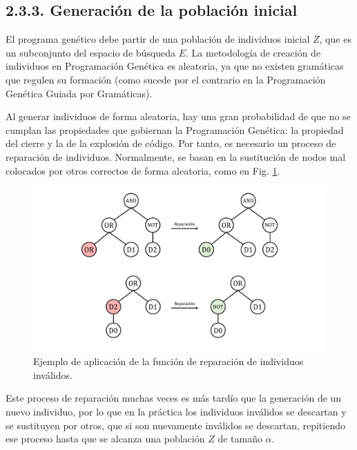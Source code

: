 \documentclass[spanish,a4paper,12pt,twoside]{report}
\begin{document}
    \subsection*{\large 2.3.3. Generación de la población inicial}
    El programa genético debe partir de una población de individuos inicial $Z$, que es un subconjunto del espacio de búsqueda $E$. La metodología de creación de individuos en Programación Genética es aleatoria, ya que no existen gramáticas que regulen su formación (como sucede por el contrario en la Programación Genética Guiada por Gramáticas). \par
    Al generar individuos de forma aleatoria, hay una gran probabilidad de que no se cumplan las propiedades que gobiernan la Programación Genética: la propiedad del cierre y la de la explosión de código. Por tanto, es necesario un proceso de reparación de individuos. Normalmente, se basan en la sustitución de nodos mal colocados por otros correctos de forma aleatoria, como en Fig. \ref{fig:5}. \par
    \begin{figure}[H]
      \centering
      \includegraphics[width = 1\textwidth]{resources/Fig5.pdf}
      \caption{Ejemplo de aplicación de la función de reparación de individuos inválidos.}
      \label{fig:5}
    \end{figure} \par
    Este proceso de reparación muchas veces es más tardío que la generación de un nuevo individuo, por lo que en la práctica los individuos inválidos se descartan y se sustituyen por otros, que si son nuevamente inválidos se descartan, repitiendo ese proceso hasta que se alcanza una población $Z$ de tamaño $\alpha$.
\end{document}
